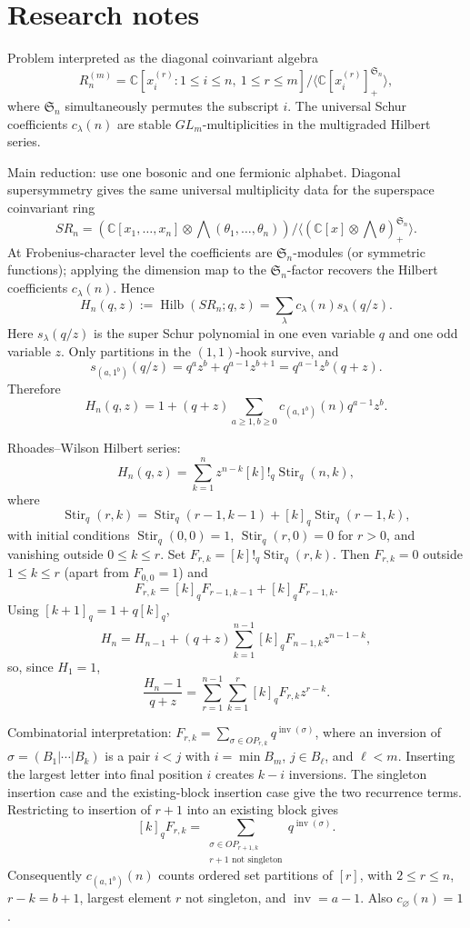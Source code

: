 \documentclass[12pt]{article}
\begin{document}
\section*{Research notes}

Problem interpreted as the diagonal coinvariant algebra
\[
R_n^{(m)}=\mathbb C[x_i^{(r)}:1\le i\le n,\ 1\le r\le m]/
\langle \mathbb C[x_i^{(r)}]^{\mathfrak S_n}_{+}\rangle ,
\]
where \(\mathfrak S_n\) simultaneously permutes the subscript \(i\).  The
universal Schur coefficients \(c_\lambda(n)\) are stable \(GL_m\)-multiplicities
in the multigraded Hilbert series.

Main reduction: use one bosonic and one fermionic alphabet.  Diagonal
supersymmetry gives the same universal multiplicity data for the superspace
coinvariant ring
\[
SR_n=(\mathbb C[x_1,\ldots,x_n]\otimes \bigwedge(\theta_1,\ldots,\theta_n))/
\langle(\mathbb C[x]\otimes\bigwedge\theta)^{\mathfrak S_n}_{+}\rangle .
\]
At Frobenius-character level the coefficients are \(\mathfrak S_n\)-modules (or
symmetric functions); applying the dimension map to the \(\mathfrak S_n\)-factor
recovers the Hilbert coefficients \(c_\lambda(n)\).  Hence
\[
H_n(q,z):=\operatorname{Hilb}(SR_n;q,z)=\sum_\lambda c_\lambda(n)s_\lambda(q/z).
\]
Here \(s_\lambda(q/z)\) is the super Schur polynomial in one even variable \(q\)
and one odd variable \(z\).  Only partitions in the \((1,1)\)-hook survive, and
\[
s_{(a,1^b)}(q/z)=q^az^b+q^{a-1}z^{b+1}=q^{a-1}z^b(q+z).
\]
Therefore
\[
H_n(q,z)=1+(q+z)\sum_{a\ge1,b\ge0}c_{(a,1^b)}(n)q^{a-1}z^b.
\]

Rhoades--Wilson Hilbert series:
\[
H_n(q,z)=\sum_{k=1}^n z^{n-k}[k]!_q\operatorname{Stir}_q(n,k),
\]
where
\[
\operatorname{Stir}_q(r,k)=\operatorname{Stir}_q(r-1,k-1)+[k]_q\operatorname{Stir}_q(r-1,k),
\]
with initial conditions \(\operatorname{Stir}_q(0,0)=1\),
\(\operatorname{Stir}_q(r,0)=0\) for \(r>0\), and vanishing outside
\(0\le k\le r\).  Set \(F_{r,k}=[k]!_q\operatorname{Stir}_q(r,k)\).  Then
\(F_{r,k}=0\) outside \(1\le k\le r\) (apart from \(F_{0,0}=1\)) and
\[
F_{r,k}=[k]_qF_{r-1,k-1}+[k]_qF_{r-1,k}.
\]
Using \([k+1]_q=1+q[k]_q\),
\[
H_n=H_{n-1}+(q+z)\sum_{k=1}^{n-1}[k]_qF_{n-1,k}z^{n-1-k},
\]
so, since \(H_1=1\),
\[
\frac{H_n-1}{q+z}=\sum_{r=1}^{n-1}\sum_{k=1}^r [k]_qF_{r,k}z^{r-k}.
\]

Combinatorial interpretation: \(F_{r,k}=\sum_{\sigma\in OP_{r,k}}q^{\operatorname{inv}(\sigma)}\), where an inversion of
\(\sigma=(B_1|\cdots|B_k)\) is a pair \(i<j\) with \(i=\min B_m\),
\(j\in B_\ell\), and \(\ell<m\).  Inserting the largest letter into final
position \(i\) creates \(k-i\) inversions.  The singleton insertion case and the
existing-block insertion case give the two recurrence terms.  Restricting to
insertion of \(r+1\) into an existing block gives
\[
[k]_qF_{r,k}=\sum_{\substack{\sigma\in OP_{r+1,k}\\r+1\text{ not singleton}}}
q^{\operatorname{inv}(\sigma)}.
\]
Consequently \(c_{(a,1^b)}(n)\) counts ordered set partitions of \([r]\), with
\(2\le r\le n\), \(r-k=b+1\), largest element \(r\) not singleton, and
\(\operatorname{inv}=a-1\).  Also \(c_\varnothing(n)=1\).
\end{document}
